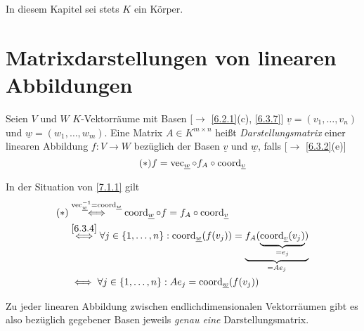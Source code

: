 \documentclass[../../main.tex]{subfiles}
\begin{document}
In diesem Kapitel sei stets $K$ ein Körper.

\section{Matrixdarstellungen von linearen Abbildungen}

\begin{df}\label{7.1.1}
Seien $V$ und $W$ $K$-Vektorräume mit Basen [$\to$ \ref{6.2.1}(c), \ref{6.3.7}] $\underline{v} = (v_1,\ldots,v_n)$ und $\underline{w} = (w_1,\ldots,w_m)$. Eine Matrix $A\in K^{m\times n}$ heißt \emph{Darstellungsmatrix} einer linearen Abbildung $f:V\to W$ bezüglich der Basen $\underline{v}$ und $\underline{w}$, falls [$\to$ \ref{6.3.2}(e)]
\begin{equation}\tag{$*$}
f = \operatorname{vec}_{\underline{w}}\circ f_A\circ \operatorname{coord}_{\underline{v}}
\end{equation}
\begin{center}
\end{center}
\end{df}

\begin{bem}\label{7.1.2}
In der Situation von \ref{7.1.1} gilt
\begin{align*}
(*) & \overset{\operatorname{vec}_{\underline{w}}^{-1} = \operatorname{coord}_{\underline{w}}}{\iff} \operatorname{coord}_{\underline{w}}\circ f = f_A\circ \operatorname{coord}_{\underline{v}}\\
& \overset{\ref{6.3.4}}\iff \forall j\in \left\{1,\ldots,n\right\}:\operatorname{coord}_{\underline{w}}(f(v_j)) = \underbrace{f_A(\underbrace{\operatorname{coord}_{\underline{v}}(v_j)}_{=e_j})}_{= Ae_j}\\
& \iff \forall j\in \left\{1,\ldots,n\right\}: Ae_j = \operatorname{coord}_{\underline{w}}(f(v_j))
\end{align*}

\bigskip\noindent
Zu jeder linearen Abbildung zwischen endlichdimensionalen Vektorräumen gibt es also bezüglich gegebener Basen jeweils \emph{genau eine} Darstellungsmatrix.
\end{bem}
\end{document}
